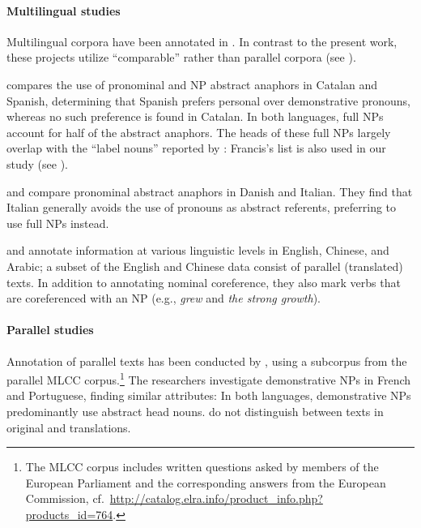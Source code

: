 \documentclass[output=paper]{LSP/langsci}
\begin{document}
\paragraph*{Multilingual studies} Multilingual corpora have been annotated in \cite{recasens08,navarretta+olsen08,navarretta08,Pradhan2007,ontonotes4}. In contrast to the present work, these projects utilize ``comparable'' rather than parallel corpora (see ). 

\cite{recasens08} compares the use of pronominal and NP abstract anaphors in Catalan and Spanish, determining that Spanish prefers personal over demonstrative pronouns, whereas no such preference is found in Catalan. In both languages, full NPs account for half of the abstract anaphors. The heads of these full NPs largely overlap with the ``label nouns'' reported by \cite{francis94}: Francis's list is also used in our study (see ).

\cite{navarretta08} and \cite{navarretta+olsen08} compare pronominal abstract anaphors in Danish and Italian. They find that Italian generally avoids the use of pronouns as abstract referents, preferring  to use full NPs instead. %

\cite{Pradhan2007} and \cite{ontonotes4} annotate information at various linguistic levels in English, Chinese, and Arabic; a subset of the English and Chinese data consist of  parallel (translated) texts. In addition to annotating nominal coreference, they also mark verbs that are coreferenced with an NP (e.g., \emph{grew} and \emph{the strong growth}).


\paragraph*{Parallel studies} Annotation of parallel texts has been conducted by \cite{vieiraEtAl02}, using a subcorpus from the parallel MLCC corpus.\footnote{The MLCC corpus includes written questions asked by members of the European Parliament and the corresponding answers from the European Commission, cf.~\url{http://catalog.elra.info/product_info.php?products_id=764}.} The researchers investigate demonstrative NPs in French and Portuguese, finding similar attributes: In both languages, demonstrative NPs predominantly use  abstract head nouns. %
\cite{vieiraEtAl02} do not distinguish between texts in original and translations.

\end{document}
